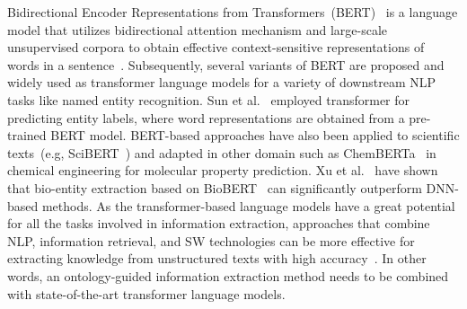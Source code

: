 \hspace*{3.5mm} Bidirectional Encoder Representations from Transformers~(BERT)~\cite{devlin2018bert} is a language model that utilizes bidirectional attention mechanism and large-scale unsupervised corpora to obtain effective context-sensitive representations of words in a sentence~\cite{xue2019fine}. Subsequently, several variants of BERT are proposed and widely used as transformer language models for a variety of downstream NLP tasks like named entity recognition. Sun et al.~\cite{sun2020biomedical} employed transformer for predicting entity labels, where word representations are obtained from a pre-trained BERT model. BERT-based approaches have also been applied to scientific texts~(e.g, SciBERT~\cite{Beltagy2019SciBERT}) and adapted in other domain such as ChemBERTa~\cite{chithrananda2020chemberta} in chemical engineering for molecular property prediction.
Xu et al.~\cite{xu2020building} have shown that bio-entity extraction based on BioBERT~\cite{lee2020biobert} can significantly outperform DNN-based methods. As the transformer-based language models have a great potential for all the tasks involved in information extraction, approaches that combine NLP, information retrieval, and SW technologies can be more effective for extracting knowledge from unstructured texts with high accuracy~\cite{anantharangachar2013ontology}. %
In other words, an ontology-guided information extraction method needs to be combined with state-of-the-art transformer language models. %


